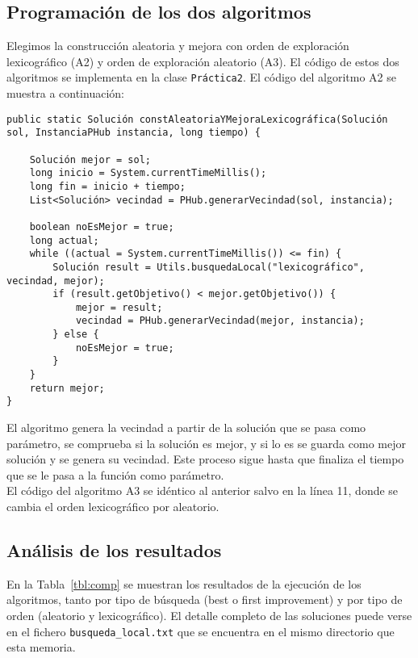 \documentclass[12pt,a4paper,twoside,openright,titlepage,final]{article}
\begin{document}
\subsection{Programación de los dos algoritmos}

Elegimos la construcción aleatoria y mejora con orden de exploración lexicográfico (A2) y orden de exploración aleatorio (A3). El código de estos dos algoritmos se implementa en la clase \texttt{Práctica2}. El código del algoritmo A2 se muestra a continuación:

\begin{verbatim}
public static Solución constAleatoriaYMejoraLexicográfica(Solución sol, InstanciaPHub instancia, long tiempo) {

    Solución mejor = sol;
    long inicio = System.currentTimeMillis();
    long fin = inicio + tiempo;
    List<Solución> vecindad = PHub.generarVecindad(sol, instancia);

    boolean noEsMejor = true;
    long actual;
    while ((actual = System.currentTimeMillis()) <= fin) {
        Solución result = Utils.busquedaLocal("lexicográfico", vecindad, mejor);
        if (result.getObjetivo() < mejor.getObjetivo()) {
            mejor = result;
            vecindad = PHub.generarVecindad(mejor, instancia);				
        } else {
            noEsMejor = true;
        }
    }
    return mejor;
}

\end{verbatim}

El algoritmo genera la vecindad a partir de la solución que se pasa como parámetro, se comprueba si la solución es mejor, y si lo es se guarda como mejor solución y se genera su vecindad. Este proceso sigue hasta que finaliza el tiempo que se le pasa a la función como parámetro.\\

El código del algoritmo A3 se idéntico al anterior salvo en la línea 11, donde se cambia el orden lexicográfico por aleatorio.


\subsection{Análisis de los resultados}

En la Tabla~\ref{tbl:comp} se muestran los resultados de la ejecución de los algoritmos, tanto por tipo de búsqueda (best o first improvement) y por tipo de orden (aleatorio y lexicográfico). El detalle completo de las soluciones puede verse en el fichero \texttt{busqueda\_local.txt} que se encuentra en el mismo directorio que esta memoria.\\
\end{document}
